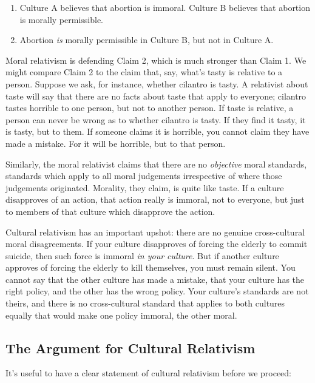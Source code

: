 \documentclass[9pt]{article}
\providecommand{\tightlist}{%
  \setlength{\itemsep}{0pt}\setlength{\parskip}{0pt}}
\begin{document}
\begin{enumerate}
\def\labelenumi{\arabic{enumi}.}
\tightlist
\item
  Culture A believes that abortion is immoral. Culture B believes that
  abortion is morally permissible.
\item
  Abortion \emph{is} morally permissible in Culture B, but not in
  Culture A.
\end{enumerate}

Moral relativism is defending Claim 2, which is much stronger than Claim
1. We might compare Claim 2 to the claim that, say, what's tasty is
relative to a person. Suppose we ask, for instance, whether cilantro is
tasty. A relativist about taste will say that there are no facts about
taste that apply to everyone; cilantro tastes horrible to one person,
but not to another person. If taste is relative, a person can never be
wrong as to whether cilantro is tasty. If they find it tasty, it is
tasty, but to them. If someone claims it is horrible, you cannot claim
they have made a mistake. For it will be horrible, but to that person.

Similarly, the moral relativist claims that there are no
\emph{objective} moral standards, standards which apply to all moral
judgements irrespective of where those judgements originated. Morality,
they claim, is quite like taste. If a culture disapproves of an action,
that action really is immoral, not to everyone, but just to members of
that culture which disapprove the action.

Cultural relativism has an important upshot: there are no genuine
cross-cultural moral disagreements. If your culture disapproves of
forcing the elderly to commit suicide, then such force is immoral
\emph{in your culture}. But if another culture approves of forcing the
elderly to kill themselves, you must remain silent. You cannot say that
the other culture has made a mistake, that your culture has the right
policy, and the other has the wrong policy. Your culture's standards are
not theirs, and there is no cross-cultural standard that applies to both
cultures equally that would make one policy immoral, the other moral.

\subsection{The Argument for Cultural
Relativism}\label{the-argument-for-cultural-relativism}

It's useful to have a clear statement of cultural relativism before we
proceed:
\end{document}

